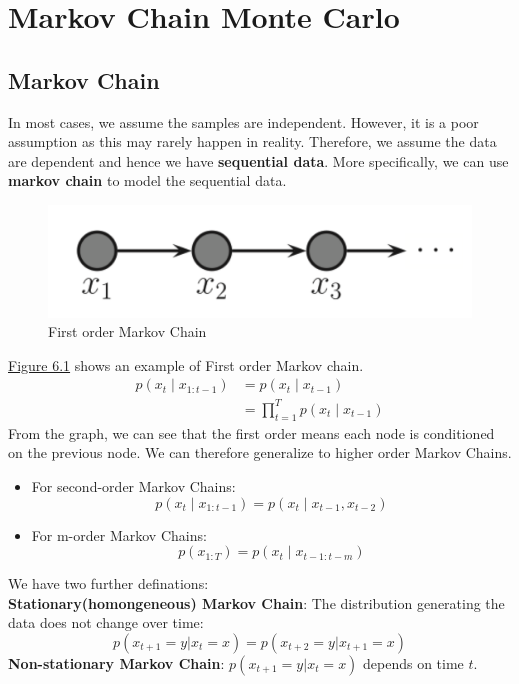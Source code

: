 \section{Markov Chain Monte Carlo}
\subsection{Markov Chain}
In most cases, we assume the samples are independent. However, it is a poor assumption as this may rarely happen in reality. Therefore, we assume the data are dependent and hence we have \textbf{sequential data}. More specifically, we can use \textbf{markov chain} to model the sequential data.
\begin{figure}[H]
    \centering
    \includegraphics[width = .6\linewidth]{figures/section6/figure_6_1.png}
    \caption{First order Markov Chain}
    \label{fig:f_mc}
\end{figure}
\hyperref[fig:f_mc]{Figure 6.1} shows an example of First order Markov chain.
\begin{align*} 
    p\left(x_t \mid x_{1: t-1}\right)&=p\left(x_t \mid x_{t-1}\right)\\
    &=\prod_{t=1}^T p\left(x_t \mid x_{t-1}\right)
\end{align*}
From the graph, we can see that the first order means each node is conditioned on the previous node. We can therefore generalize to higher order Markov Chains.
\begin{itemize}    \item For second-order Markov Chains:
    $$p\left(x_t \mid x_{1: t-1}\right)=p\left(x_t \mid x_{t-1},x_{t-2}\right)$$
    \item For m-order Markov Chains:
    $$p\left(x_{1: T}\right)=p\left(x_t \mid x_{t-1:t-m}\right)$$
\end{itemize}
We have two further definations:\\
\textbf{Stationary(homongeneous) Markov Chain}: The distribution generating the data does not change over time:
$$p(x_{t+1}=y|x_t=x)=p(x_{t+2}=y|x_{t+1}=x)$$ 
\textbf{Non-stationary Markov Chain}: $p(x_{t+1}=y|x_t=x)$ depends on time $t$.